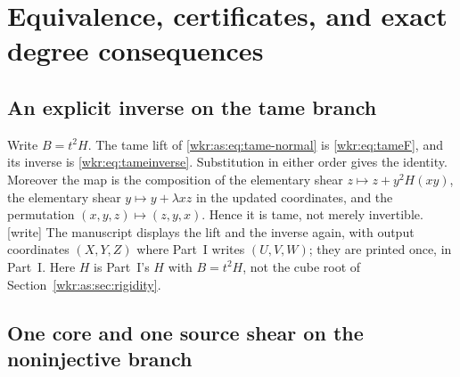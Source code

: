 \documentclass[11pt,a4paper]{article}
\numberwithin{equation}{section}
\theoremstyle{definition}
\theoremstyle{remark}
\begin{document}
\section{Equivalence, certificates, and exact degree consequences}
\label{wkr:as:sec:consequences}

\subsection{An explicit inverse on the tame branch}

Write $B=t^2H$. The tame lift of \eqref{wkr:as:eq:tame-normal} is
\eqref{wkr:eq:tameF}, and its inverse is \eqref{wkr:eq:tameinverse}.
Substitution in either order gives the identity. Moreover the map is the
composition of the elementary shear $z\mapsto z+y^2H(xy)$, the elementary
shear $y\mapsto y+\lambda xz$ in the updated coordinates, and the
permutation $(x,y,z)\mapsto(z,y,x)$. Hence it is tame, not merely
invertible.
\textup{[write]} The manuscript displays the lift and the inverse again,
with output coordinates $(X,Y,Z)$ where Part~I writes $(U,V,W)$; they are
printed once, in Part~I. Here $H$ is Part~I's $H$ with $B=t^2H$, not the
cube root of Section~\ref{wkr:as:sec:rigidity}.

\subsection{One core and one source shear on the noninjective branch}
\end{document}
